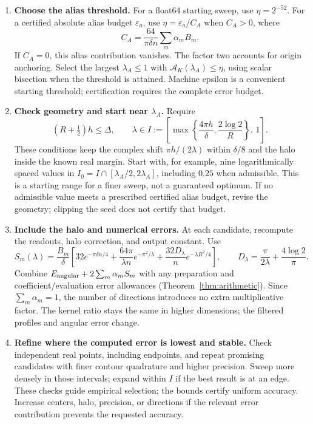\documentclass[11pt,letterpaper]{article}
\newcommand{\eps}{\varepsilon}
\theoremstyle{definition}
\theoremstyle{remark}
\begin{document}
\begin{enumerate}
\item \textbf{Choose the alias threshold.} For a float64 starting sweep,
use \(\eta=2^{-52}\). For a certified absolute alias budget
\(\eps_a\), use \(\eta=\eps_a/C_A\) when \(C_A>0\), where
\[
C_A=\frac{64}{\pi\delta n}\sum_m\alpha_mB_m.
\]
If \(C_A=0\), this alias contribution vanishes.
The factor two accounts for origin anchoring. Select the largest
\(\lambda_A\le1\) with \(\mathcal A_K(\lambda_A)\le\eta\), using scalar bisection
when the threshold is attained. Machine epsilon is a convenient starting
threshold; certification requires the complete error budget.

\item \textbf{Check geometry and start near \(\lambda_A\).} Require
\begin{equation}\label{eq:lambda-admissible}
 (R+\tfrac12)h\le\Delta,\qquad
 \lambda\in I:=\left[\max\left\{\frac{4\pi h}{\delta},
                                  \frac{2\log2}{R}\right\},\,1\right].
\end{equation}
These conditions keep the complex shift \(\pi h/(2\lambda)\) within
\(\delta/8\) and the halo inside the known real margin. Start with, for
example, nine logarithmically spaced values in
\(I_0=I\cap[\lambda_A/2,2\lambda_A]\), including \(0.25\) when admissible.
This is a starting range for a finer sweep, not a guaranteed optimum.
If no admissible value meets a prescribed certified alias budget, revise the
geometry; clipping the seed does not certify that budget.

\item \textbf{Include the halo and numerical errors.} At each candidate,
recompute the readouts, halo correction, and output constant. Use
\begin{equation}\label{eq:lambda-score}
 S_m(\lambda)=\frac{B_m}{\delta}\left[
 32e^{-\pi\delta n/4}
 +\frac{64\pi}{\lambda n}e^{-\pi^2/\lambda}
 +\frac{32D_\lambda}{n}e^{-\lambda R^2/4}\right],
 \qquad D_\lambda=\frac\pi{2\lambda}+\frac{4\log2}{\pi}.
\end{equation}
Combine \(E_{\rm angular}+2\sum_m\alpha_mS_m\) with any preparation and
coefficient/evaluation error allowances (Theorem~\ref{thm:arithmetic}).
Since \(\sum_m\alpha_m=1\), the number of directions introduces no extra
multiplicative factor. The kernel ratio stays the same in higher dimensions;
the filtered profiles and angular error change.

\item \textbf{Refine where the computed error is lowest and stable.}
Check independent real points, including endpoints, and repeat promising
candidates with finer contour quadrature and higher precision. Sweep more
densely in those intervals; expand within \(I\) if the best result is at
an edge. These checks guide empirical selection; the bounds certify uniform
accuracy. Increase centers, halo, precision, or directions if the relevant
error contribution prevents the requested accuracy.
\end{enumerate}
\end{document}
